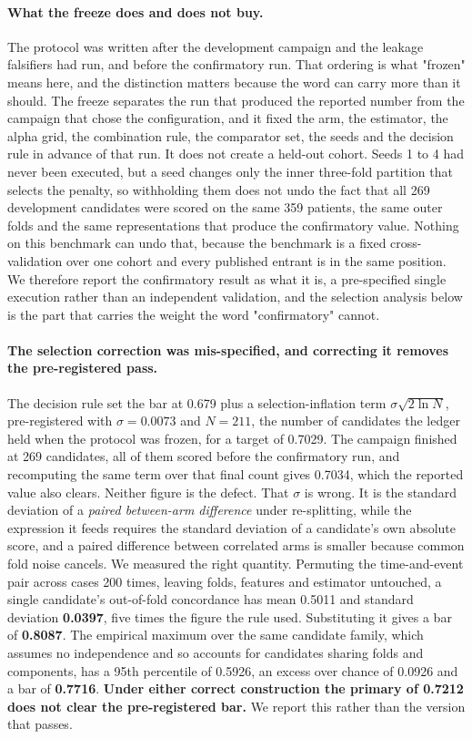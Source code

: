 \documentclass[unnumsec,webpdf,contemporary,large]{oup-authoring-template}
\begin{document}
\paragraph{What the freeze does and does not buy.} The protocol was written after the development
campaign and the leakage falsifiers had run, and before the confirmatory run. That ordering is what "frozen" means here, and the distinction matters because the word can carry more than it should. The freeze separates the run that produced the reported number from
the campaign that chose the configuration, and it fixed the arm, the estimator, the alpha grid, the
combination rule, the comparator set, the seeds and the decision rule in advance of that run. It
does not create a held-out cohort. Seeds 1 to 4 had never been executed, but a seed changes only
the inner three-fold partition that selects the penalty, so withholding them does not undo the fact
that all 269 development candidates were scored on the same 359 patients, the same outer folds and
the same representations that produce the confirmatory value. Nothing on this benchmark can undo
that, because the benchmark is a fixed cross-validation over one cohort and every published entrant
is in the same position. We therefore report the confirmatory result as what it is, a
pre-specified single execution rather than an independent validation, and the selection analysis
below is the part that carries the weight the word "confirmatory" cannot.

\paragraph{The selection correction was mis-specified, and correcting it removes the
pre-registered pass.} The decision rule set the bar at 0.679 plus a selection-inflation term
$\sigma\sqrt{2\ln N}$, pre-registered with $\sigma = 0.0073$ and $N = 211$, the number of
candidates the ledger held when the protocol was frozen, for a target of 0.7029. The campaign
finished at 269 candidates, all of them scored before the confirmatory run, and recomputing the
same term over that final count gives 0.7034, which the reported value also clears. Neither figure
is the defect. That $\sigma$ is wrong.
It is the standard deviation of a \emph{paired between-arm difference} under re-splitting, while
the expression it feeds requires the standard deviation of a candidate's own absolute score, and a
paired difference between correlated arms is smaller because common fold noise cancels. We measured
the right quantity. Permuting the time-and-event pair across cases 200 times, leaving folds,
features and estimator untouched, a single candidate's out-of-fold concordance has mean 0.5011 and
standard deviation \textbf{0.0397}, five times the figure the rule used. Substituting it gives a
bar of \textbf{0.8087}. The empirical maximum over the same candidate family, which assumes no
independence and so accounts for candidates sharing folds and components, has a 95th percentile of
0.5926, an excess over chance of 0.0926 and a bar of \textbf{0.7716}. \textbf{Under either correct
construction the primary of 0.7212 does not clear the pre-registered bar.} We report this rather
than the version that passes.
\end{document}

